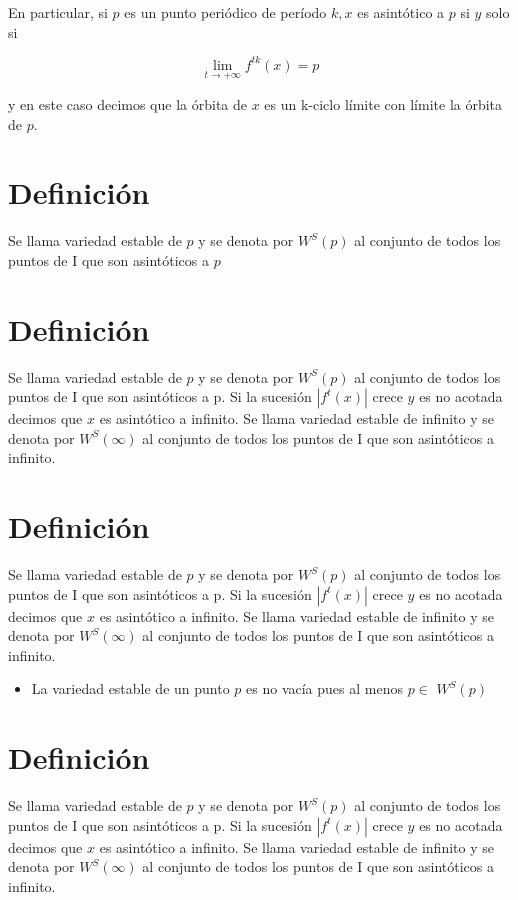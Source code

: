\documentclass[11pt]{beamer}
\begin{document}
En particular, si $p$ es un punto periódico de período $k, x$ es asintótico a $p$ si $y$ solo si

$$
\lim _{t \rightarrow+\infty} f^{t k}(x)=p
$$

y en este caso decimos que la órbita de $x$ es un k-ciclo límite con límite la órbita de $p$.

\section*{Definición}
Se llama variedad estable de $p$ y se denota por $W^{S}(p)$ al conjunto de todos los puntos de I que son asintóticos a $p$

\section*{Definición}
Se llama variedad estable de $p$ y se denota por $W^{S}(p)$ al conjunto de todos los puntos de I que son asintóticos a p. Si la sucesión $\left|f^{t}(x)\right|$ crece $y$ es no acotada decimos que $x$ es asintótico a infinito. Se llama variedad estable de infinito y se denota por $W^{S}(\infty)$ al conjunto de todos los puntos de I que son asintóticos a infinito.

\section*{Definición}
Se llama variedad estable de $p$ y se denota por $W^{S}(p)$ al conjunto de todos los puntos de I que son asintóticos a p. Si la sucesión $\left|f^{t}(x)\right|$ crece $y$ es no acotada decimos que $x$ es asintótico a infinito. Se llama variedad estable de infinito y se denota por $W^{S}(\infty)$ al conjunto de todos los puntos de I que son asintóticos a infinito.

\begin{itemize}
  \item La variedad estable de un punto $p$ es no vacía pues al menos $p \in$ $W^{S}(p)$
\end{itemize}

\section*{Definición}
Se llama variedad estable de $p$ y se denota por $W^{S}(p)$ al conjunto de todos los puntos de I que son asintóticos a p. Si la sucesión $\left|f^{t}(x)\right|$ crece $y$ es no acotada decimos que $x$ es asintótico a infinito. Se llama variedad estable de infinito y se denota por $W^{S}(\infty)$ al conjunto de todos los puntos de I que son asintóticos a infinito.
\end{document}
